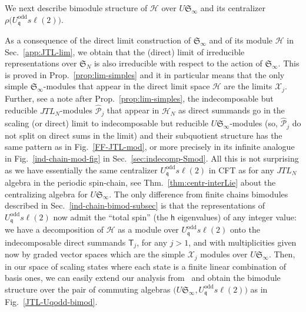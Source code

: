 \documentclass[11pt]{article}
\newcommand{\q}{\mathfrak{q}}
\newcommand{\JTL}[1]{JTL_{#1}}
\newcommand{\LQGodd}{U^{\text{odd}}_{\q} s\ell(2)}
\newcommand{\h}{\mathsf{h}}
\newcommand{\Hilb}{\mathcal{H}}
\newcommand{\oN}{\mathbb{N}}
\newcommand{\Endo}{\mathrm{End}}
\newcommand{\Hom}{\mathrm{Hom}}
\newcommand{\interLie}{\mathfrak{S}}
\newcommand{\interfin}[1]{\interLie_{#1}}
\newcommand{\interinfin}{\interLie_{\infty}}
\newcommand{\interM}[1]{\mathscr{X}_{#1}}
\newcommand{\interP}[1]{\mathscr{Y}_{#1}}
\newcommand{\PPodd}[1]{\mathsf{T}_{#1}}
\newcommand{\APrTL}[1]{\widehat{\mathscr{P}}_{#1}}
\theoremstyle{definition}
\begin{document}
\medskip

We next describe  bimodule structure of $\Hilb$ over $U\interinfin$ and its centralizer  $\rho\bigl(\LQGodd\bigr)$.


As a consequence of the direct limit construction of $\interinfin$ and of its module $\Hilb$ in Sec.~\ref{app:JTL-lim}, we obtain that the (direct) limit of irreducible representations over $\interfin{N}$ is also irreducible with respect to the action of $\interinfin$. This is proved in Prop.~\ref{prop:lim-simples} and it in particular means that the only simple $\interinfin$-modules that appear in the direct limit space $\Hilb$ are the limits $\interM{j}$.
Further, see a note after Prop.~\ref{prop:lim-simples}, the indecomposable but reducible $\JTL{N}$-modules $\APrTL{j}$ that appear in $\Hilb_N$ as direct summands go in the scaling (or direct) limit to
indecomposable but reducible $U\interinfin$-modules (so, $\APrTL{j}$ do not split on direct sums in the limit) and their subquotient structure has the same pattern as in Fig.~\ref{FF-JTL-mod}, or more precisely in  its  infinite analogue in Fig.~\ref{ind-chain-mod-fig} in Sec.~\ref{sec:indecomp-Smod}.
All this is not surprising as we have essentially the same centralizer $\LQGodd$ in CFT as for any $\JTL{N}$ algebra in the periodic spin-chain,
 see Thm.~\ref{thm:centr-interLie} about the centralizing algebra for $U\interinfin$.
 The only difference from finite chains bimodules described in Sec.~\ref{ind-chain-bimod-subsec} is that the representations of $\LQGodd$ now admit the ``total spin'' (the $\h$ eigenvalues) of any integer value:
 we have a decomposition of $\Hilb$ as a module over $\LQGodd$ onto the indecomposable direct summands $\PPodd{j}$, for any $j>1$, and  with multiplicities given now by graded vector spaces which are the simple $\interM{j}$ modules over $U \interinfin$.
Then, in our space of scaling states where each state is a finite linear combination of basis ones, we can easily extend our analysis from~\cite{GRS2} and obtain the bimodule structure over the pair of commuting algebras $\bigl(U\interinfin,\LQGodd\bigr)$ as in Fig.~\ref{JTL-Uqodd-bimod}.
\end{document}
